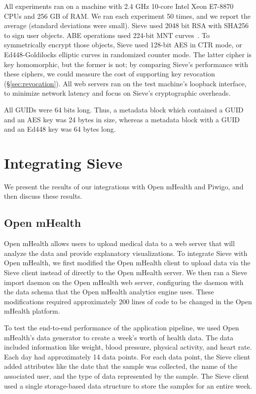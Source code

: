 All experiments ran on a machine with 2.4 GHz 10-core
Intel Xeon E7-8870 CPUs and 256 GB of RAM. We ran each
experiment 50 times, and we report the average
(standard deviations were small).
Sieve used 2048 bit RSA with SHA256 to sign
user objects. ABE operations used 224-bit MNT
curves~\cite{mnt224}. To symmetrically encrypt
those objects, Sieve used 128-bit AES in CTR
mode, or Ed448-Goldilocks elliptic curves in
randomized counter mode. The latter cipher is
key homomorphic, but the former is not; by
comparing Sieve's performance with these ciphers,
we could measure the cost of supporting key
revocation (\S\ref{sec:revocation}). All web
servers ran on the test machine's loopback
interface, to minimize network latency and
focus on Sieve's cryptographic overheads.

All GUIDs were 64 bits long. Thus, a metadata
block which contained a GUID and an AES key
was 24 bytes in size, whereas a metadata block
with a GUID and an Ed448 key was 64 bytes long.

\section{Integrating Sieve}
\label{sec:integration}
We present the results of our integrations
with Open mHealth and Piwigo, and then discuss
these results.

\subsection{Open mHealth} 
Open mHealth allows
users to upload medical data to a web server
that will analyze the data and provide
explanatory visualizations. To integrate Sieve
with Open mHealth, we first modified the Open
mHealth client to upload data via the Sieve
client instead of directly to the Open mHealth
server. We then ran a Sieve import daemon on
the Open mHealth web server, configuring the
daemon with the data schema that the Open mHealth
analytics engine uses. These modifications
required approximately 200 lines of code
to be changed in the Open mHealth platform.

To test the end-to-end performance of the
application pipeline, we used Open mHealth's
data generator to create a week's worth of
health data. The data included information
like weight, blood pressure, physical activity,
and heart rate. Each day had approximately
14 data points. For each data point, the
Sieve client added attributes like the
date that the sample was collected, the
name of the associated user, and the type
of data represented by the sample. The Sieve
client used a single storage-based data 
structure to store the samples for an entire week.

